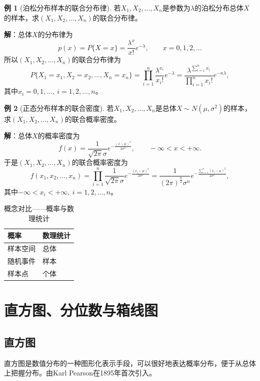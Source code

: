\documentclass[11pt,a4paper]{report}
\theoremstyle{definition}
\newtheorem{example}{例}[chapter]
\begin{document}
\begin{example}[泊松分布样本的联合分布律]
若$X_{1},X_{2},\ldots,X_{n}$是参数为$\lambda$的泊松分布总体$X$的样本，求$(X_{1},X_{2},\ldots,X_{n})$的联合分布律。

\textbf{解}：总体$X$的分布律为
\[
p(x)=P\{X=x\}=\frac{\lambda^{x}}{x!}e^{-\lambda},\qquad x=0,1,2,\ldots
\]
所以$(X_{1},X_{2},\ldots,X_{n})$的联合分布律为
\[
P\{X_{1}=x_{1},X_{2}=x_{2},\ldots,X_{n}=x_{n}\}=\prod_{i=1}^{n}\frac{\lambda^{x_{i}}}{x_{i}!}e^{-\lambda}=\frac{\lambda^{\sum_{i=1}^{n}x_{i}}}{\prod_{i=1}^{n}x_{i}!}e^{-n\lambda},
\]
其中$x_{i}=0,1,\ldots,\ i=1,2,\ldots,n$。
\end{example}

\begin{example}[正态分布样本的联合密度]
若$X_{1},X_{2},\ldots,X_{n}$是总体$X\sim N(\mu,\sigma^{2})$的样本，求$(X_{1},X_{2},\ldots,X_{n})$的联合概率密度。

\textbf{解}：总体$X$的概率密度为
\[
f(x)=\frac{1}{\sqrt{2\pi}\sigma}e^{-\frac{(x-\mu)^{2}}{2\sigma^{2}}},\qquad -\infty<x<+\infty.
\]
于是$(X_{1},X_{2},\ldots,X_{n})$的联合概率密度为
\[
f(x_{1},x_{2},\ldots,x_{n})=\prod_{i=1}^{n}\frac{1}{\sqrt{2\pi}\sigma}e^{-\frac{(x_{i}-\mu)^{2}}{2\sigma^{2}}}=\frac{1}{(2\pi)^{\frac{n}{2}}\sigma^{n}}e^{-\frac{\sum_{i=1}^{n}(x_{i}-\mu)^{2}}{2\sigma^{2}}},
\]
其中$-\infty<x_{i}<+\infty,\ i=1,2,\ldots,n$。
\end{example}

\begin{table}[htbp]
\centering
\caption{概念对比——概率与数理统计}
\begin{tabular}{@{}ll@{}}
\toprule
\textbf{概率} & \textbf{数理统计} \\
\midrule
样本空间 & 总体 \\
随机事件 & 样本 \\
样本点 & 个体 \\
\bottomrule
\end{tabular}
\end{table}

\section{直方图、分位数与箱线图}

\subsection{直方图}

直方图是数值分布的一种图形化表示手段，可以很好地表达概率分布，便于从总体上把握分布。由Karl Pearson在1895年首次引入。
\end{document}
